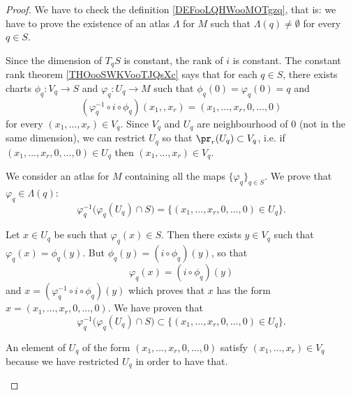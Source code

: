 \begin{proof}
	We have to check the definition \ref{DEFooLQHWooMOTgzq}, that is: we have to prove the existence of an atlas \( \Lambda\) for \( M\) such that \( \Lambda(q)\neq \emptyset\) for every \( q\in S\).

	Since the dimension of \( T_qS\) is constant, the rank of \( i\) is constant. The constant rank theorem \ref{THOooSWKVooTJQsXc} says that for each \( q\in S\), there exists charts \(\phi_q \colon V_q\to S  \) and \(\varphi_q \colon U_q\to M  \) such that \( \phi_q(0)=\varphi_q(0)=q\) and
	\begin{equation}
		(\varphi_q^{-1}\circ i\circ\phi_q)(x_1,,x_r)=(x_1,\ldots,x_r,0,\ldots,0)
	\end{equation}
	for every \( (x_1,\ldots,x_r)\in V_q\). Since \( V_q\) and \( U_q\) are neighbourhood of \( 0\) (not in the same dimension), we can restrict \( U_q\) so that \( \pr_r(U_q)\subset V_q\), i.e. if \( (x_1,\ldots,x_r,0,\ldots,0)\in U_q\) then \( (x_1,\ldots,x_r)\in V_q\).

	We consider an atlas for \( M\) containing all the maps \( \{ \varphi_q \}_{q\in S}\). We prove that \( \varphi_q\in \Lambda(q)\):
	\begin{equation}
		\varphi_q^{-1}\big( \varphi_q(U_q)\cap S \big)=\{ (x_1,\ldots,x_r,0,\ldots,0)\in U_{q} \}.
	\end{equation}

	\begin{subproof}
		Let \( x\in U_q\) be such that \( \varphi_q(x)\in S\). Then there exists \( y\in V_q\) such that \( \varphi_q(x)=\phi_q(y)\). But \( \phi_q(y)=(i\circ \phi_q)(y)\), so that
		\begin{equation}
			\varphi_q(x)=(i\circ \phi_q)(y)
		\end{equation}
		and \( x=(\varphi_q^{-1}\circ i\circ \phi_q)(y)\) which proves that \( x\) has the form \( x=(x_1,\ldots,x_r,0,\ldots,0)\). We have proven that
		\begin{equation}
			\varphi_q^{-1}\big( \varphi_q(U_q)\cap S \big)\subset\{ (x_1,\ldots,x_r,0,\ldots,0)\in U_q \}.
		\end{equation}

		An element of \( U_q\) of the form \( (x_1,\ldots,x_r,0,\ldots,0)\) satisfy \( (x_1,\ldots,x_r)\in V_q\) because we have restricted \( U_q\) in order to have that.
	\end{subproof}
\end{proof}

